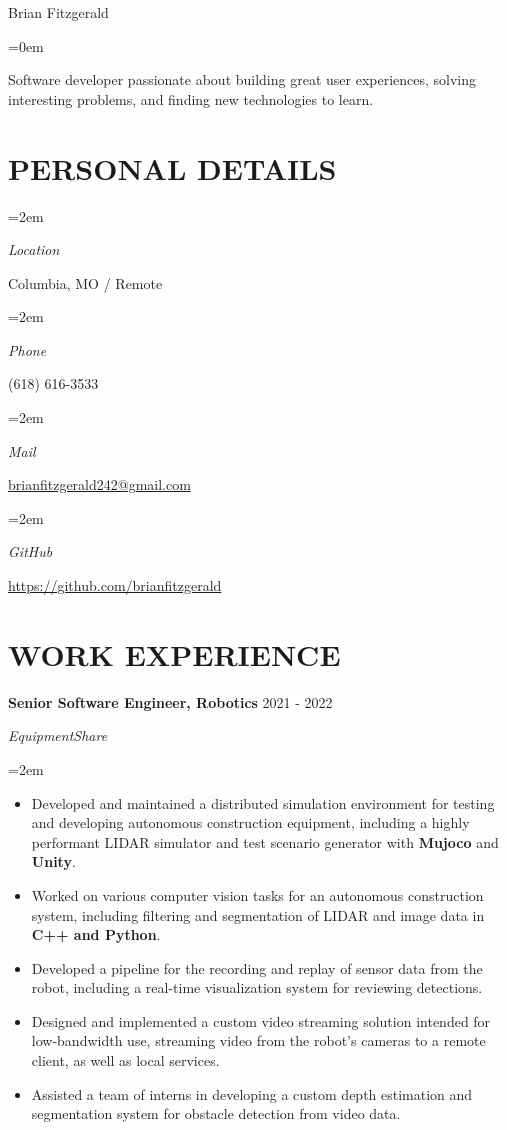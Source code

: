 \documentclass[paper=a4,fontsize=9pt]{scrartcl} %
\newlength{\spacebox}
\newcommand{\sepspace}{\vspace*{0.8em}}		%
\newcommand{\MyName}[1]{ %
			\Huge \usefont{OT1}{phv}{b}{n} \hfill #1
			\par \normalsize \normalfont}
\newcommand{\NewPart}[1]{\section*{\uppercase{#1}}}
\newcommand{\PersonalEntry}[2]{
			\noindent\hangindent=2em\hangafter=0 %
			\parbox{\spacebox}{        %
			\textit{#1}}		       %
			\hspace{1.5em} #2 \par}    %
\newcommand{\PersonalStatement}[2]{
			\noindent\hangindent=0em\hangafter=0 %
			\parbox{\spacebox}{        %
			\textit{#1}}		       %
			\hspace{-5.5em} #2 \par}    %
\newcommand{\EducationEntry}[4]{
			\noindent \textbf{#1} \hfill      %
			\colorbox{Black}{%
				\parbox{6em}{%
				\hfill\color{White}#2}} \par  %
			\noindent \textit{#3} \par        %
			\noindent\hangindent=2em\hangafter=0 \small #4 %
			\normalsize \par}
\newcommand{\WorkEntry}[4]{				  %
			\noindent \textbf{#1} \hfill      %
			\colorbox{White}{\color{Black}#2} \par  %
			\noindent \textit{#3} \par              %
			\noindent\hangindent=2em\hangafter=0 \small #4 %
			\normalsize \par}
\begin{document}
	
	\MyName{Brian Fitzgerald}
	
	\sepspace

	\PersonalStatement{}{Software developer passionate about building great user experiences, solving interesting problems, and finding new technologies to learn.}

	
	\NewPart{Personal details}{}
	
	\PersonalEntry{Location}{Columbia, MO / Remote}
	\PersonalEntry{Phone}{(618) 616-3533}
	\PersonalEntry{Mail}{\url{brianfitzgerald242@gmail.com}}
	\PersonalEntry{GitHub}{\url{https://github.com/brianfitzgerald}}

	\NewPart{Work experience}{}

	\WorkEntry{Senior Software Engineer, Robotics}{2021 - 2022}{EquipmentShare}{
		\begin{itemize}
			\item Developed and maintained a distributed simulation environment for testing and developing autonomous construction equipment, including a highly performant LIDAR simulator and test scenario generator with \textbf{Mujoco} and \textbf{Unity}.

			\item Worked on various computer vision tasks for an autonomous construction system, including filtering and segmentation of LIDAR and image data in \textbf{C++ and Python}.
			\item Developed a pipeline for the recording and replay of sensor data from the robot, including a real-time visualization system for reviewing detections.
			\item Designed and implemented a custom video streaming solution intended for low-bandwidth use, streaming video from the robot's cameras to a remote client, as well as local services.
			\item Assisted a team of interns in developing a custom depth estimation and segmentation system for obstacle detection from video data.
		\end{itemize}
	}
	\sepspace
\end{document}
